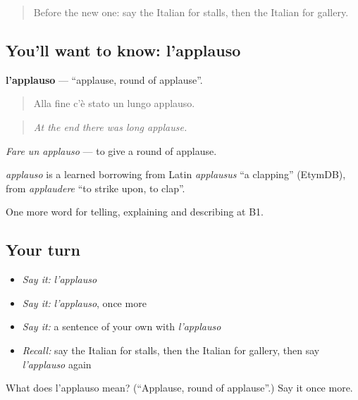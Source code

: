 \label{lesson:IT-C519-applauso}



\begin{quote}
Before the new one: say the Italian for stalls, then the Italian for gallery.
\end{quote}

\subsection*{You'll want to know: l'applauso}
\textbf{l'applauso} — \textquotedblleft{}applause, round of applause\textquotedblright{}.

\begin{quote}
Alla fine c'è stato un lungo applauso.
\end{quote}

\begin{quote}
\emph{At the end there was long applause.}
\end{quote}

\emph{Fare un applauso} — to give a round of applause.

\begin{cousinweb}
\emph{applauso} is a learned borrowing from Latin \emph{applausus} \textquotedblleft{}a clapping\textquotedblright{} (EtymDB), from \emph{applaudere} \textquotedblleft{}to strike upon, to clap\textquotedblright{}.
\end{cousinweb}

\begin{grammarlens}[title={What you've built}]
One more word for telling, explaining and describing at B1.
\end{grammarlens}

\subsection*{Your turn}
\begin{itemize}
\raggedright
  \item \emph{Say it:} \emph{l'applauso}
  \item \emph{Say it:} \emph{l'applauso}, once more
  \item \emph{Say it:} a sentence of your own with \emph{l'applauso}
  \item \emph{Recall:} say the Italian for stalls, then the Italian for gallery, then say \emph{l'applauso} again
\end{itemize}

\begin{tcolorbox}[breakable,colback=teal!4,colframe=teal!35!black,title={Before you move on}]
What does l'applauso mean? (\textquotedblleft{}Applause, round of applause\textquotedblright{}.) Say it once more.
\end{tcolorbox}
